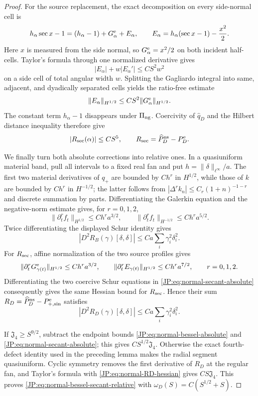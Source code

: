\documentclass[11pt]{amsart}
\numberwithin{equation}{section}
\theoremstyle{definition}
\theoremstyle{remark}
\newcommand{\Jfour}{\mathfrak J_4}
\begin{document}
\begin{proof}
For the source replacement, the exact decomposition on every side-normal
cell is
\[
 h_\alpha\sec x-1=(h_\alpha-1)+G_\alpha^{\rm e}+E_\alpha,
 \qquad E_\alpha=h_\alpha(\sec x-1)-\frac{x^2}{2}.
\]
Here $x$ is measured from the side normal, so $G_\alpha^{\rm e}=x^2/2$
on both incident half-cells.  Taylor's formula through one normalized
derivative gives
\[
 |E_\alpha|+w|E_\alpha'|\le CS^2w^2
\]
on a side cell of total angular width $w$.  Splitting the Gagliardo
integral into same, adjacent, and dyadically separated cells yields the
ratio-free estimate
\begin{equation}\label{JP:eq:normal-secant-remainder}
 \|E_\alpha\|_{H^{1/2}}
 \le CS^2\|G_\alpha^{\rm e}\|_{H^{1/2}}.
\end{equation}
The constant term $h_\alpha-1$ disappears under $\Pi_{\rm ng}$.
Coercivity of $\widehat q_D$ and the Hilbert distance inequality therefore
give
\begin{equation}\label{JP:eq:normal-secant-absolute}
 |R_{\rm sec}(\alpha)|\le CS^5,
 \qquad R_{\rm sec}=\widehat P_D^{\rm ns}-P_D^{\rm e}.
\end{equation}

We finally turn both absolute corrections into relative ones.  In a
quasiuniform material band, pull all intervals to a fixed real fan and put
$h=\|\delta\|_{\ell^\infty}/a$.  The first two material derivatives of
$q_+$ are bounded by $Ch^r$ in $H^{1/2}$, while those of $k$ are bounded by
$Ch^r$ in $H^{-1/2}$; the latter follows from
$|\Delta^rk_n|\le C_r(1+n)^{-1-r}$ and discrete summation by parts.
Differentiating the Galerkin equation and the negative-norm estimate gives,
for $r=0,1,2$,
\[
 \|\partial_t^rf_t\|_{H^{1/2}}\le Ch^ra^{3/2},
 \qquad
 \|\partial_t^rf_t\|_{H^{-1/2}}\le Ch^ra^{5/2}.
\]
Twice differentiating the displayed Schur identity gives
\[
 |D^2R_B(\gamma)[\delta,\delta]|
 \le Ca\sum_i\gamma_i^2\delta_i^2.
\]
For $R_{\rm sec}$, affine normalization of the two source profiles gives
\[
 \|\partial_t^rG_{\gamma(t)}^{\rm e}\|_{H^{1/2}}
 \le Ch^ra^{3/2},\qquad
 \|\partial_t^rE_{\gamma(t)}\|_{H^{1/2}}
 \le Ch^ra^{7/2},\qquad r=0,1,2.
\]
Differentiating the two coercive Schur equations in
\eqref{JP:eq:normal-secant-absolute} consequently gives the same Hessian
bound for $R_{\rm sec}$.  Hence their sum
$R_D=\widehat P_D^{\rm ns}-P_{+,\sin}^{\rm e}$ satisfies
\begin{equation}\label{JP:eq:normal-RD-hessian}
 |D^2R_D(\gamma)[\delta,\delta]|
 \le Ca\sum_i\gamma_i^2\delta_i^2.
\end{equation}

If $\Jfour\ge S^{9/2}$, subtract the endpoint bounds
\eqref{JP:eq:normal-bessel-absolute} and
\eqref{JP:eq:normal-secant-absolute}; this gives
$CS^{1/2}\Jfour$.  Otherwise the exact fourth-defect identity used in the
preceding lemma makes the radial segment quasiuniform.  Cyclic symmetry
removes the first derivative of $R_D$ at the regular fan, and Taylor's
formula with \eqref{JP:eq:normal-RD-hessian} gives $CS\Jfour$.  This proves
\eqref{JP:eq:normal-bessel-secant-relative} with
$\omega_D(S)=C(S^{1/2}+S)$.
\end{proof}
\end{document}
